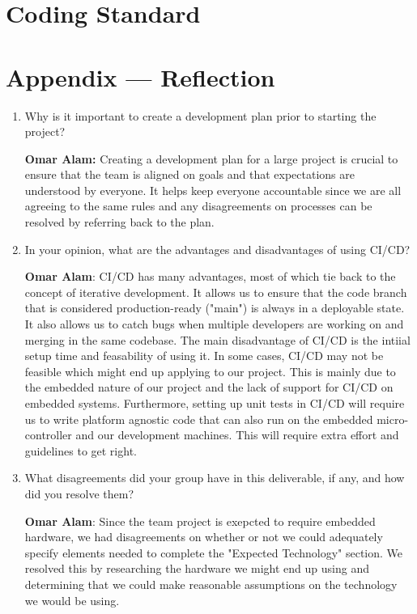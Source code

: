 \documentclass{article}
\begin{document}

\section{Coding Standard}


\newpage{}

\section*{Appendix --- Reflection}




\begin{enumerate}
    \item Why is it important to create a development plan prior to starting the
    project?

    \textbf{Omar Alam:} Creating a development plan for a large project is crucial to ensure that the team is aligned on goals
    and that expectations are understood by everyone. It helps keep everyone accountable since we are all agreeing to the same rules
    and any disagreements on processes can be resolved by referring back to the plan.
    \item In your opinion, what are the advantages and disadvantages of using
    CI/CD?

    \textbf{Omar Alam}: CI/CD has many advantages, most of which tie back to the concept of iterative development. It allows us to ensure
    that the code branch that is considered production-ready ("main") is always in a deployable state. It also allows us to catch bugs when multiple 
    developers are working on and merging in the same codebase. The main disadvantage of CI/CD is the intiial setup time and feasability of using it.
    In some cases, CI/CD may not be feasible which might end up applying to our project. This is mainly due to the embedded nature of our project 
    and the lack of support for CI/CD on embedded systems. Furthermore, setting up unit tests in CI/CD will require us to write platform agnostic
    code that can also run on the embedded micro-controller and our development machines. This will require extra effort and guidelines to get right.
    \item What disagreements did your group have in this deliverable, if any,
    and how did you resolve them?

    \textbf{Omar Alam}: Since the team project is exepcted to require embedded hardware, we had disagreements on whether or not we could adequately
    specify elements needed to complete the "Expected Technology" section. We resolved this by researching the hardware we might end up using and 
    determining that we could make reasonable assumptions on the technology we would be using.
\end{enumerate}
\end{document}
